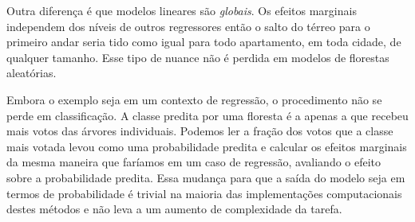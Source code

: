 Outra diferença é que modelos lineares são \textit{globais}. Os efeitos marginais independem dos níveis de outros regressores então o salto do térreo para o primeiro andar seria tido como igual para todo apartamento, em toda cidade, de qualquer tamanho. Esse tipo de nuance não é perdida em modelos de florestas aleatórias. 

Embora o exemplo seja em um contexto de regressão, o procedimento não se perde em classificação. A classe predita por uma floresta é a apenas a que recebeu mais votos das árvores individuais. Podemos ler a fração dos votos que a classe mais votada levou como uma probabilidade predita e calcular os efeitos marginais da mesma maneira que faríamos em um caso de regressão, avaliando o efeito sobre a probabilidade predita. Essa mudança para que a saída do modelo seja em termos de probabilidade é trivial na maioria das implementações computacionais destes métodos e não leva a um aumento de complexidade da tarefa.










